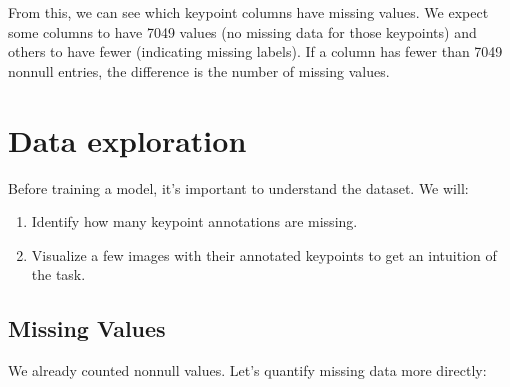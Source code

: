 \documentclass[letterpaper,10pt,english]{jupyterBook}
\begin{document}
\sphinxAtStartPar
From this, we can see which keypoint columns have missing values. We expect some columns to have 7049 values (no missing data for those keypoints) and others to have fewer (indicating missing labels). If a column has fewer than 7049 non\sphinxhyphen{}null entries, the difference is the number of missing values.


\section{Data exploration}
\label{\detokenize{04:data-exploration}}
\sphinxAtStartPar
Before training a model, it’s important to understand the dataset. We will:
\begin{enumerate}
%
\item {} 
\sphinxAtStartPar
Identify how many keypoint annotations are missing.

\item {} 
\sphinxAtStartPar
Visualize a few images with their annotated keypoints to get an intuition of the task.

\end{enumerate}


\subsection{Missing Values}
\label{\detokenize{04:id1}}
\sphinxAtStartPar
We already counted non\sphinxhyphen{}null values. Let’s quantify missing data more directly:
\end{document}
